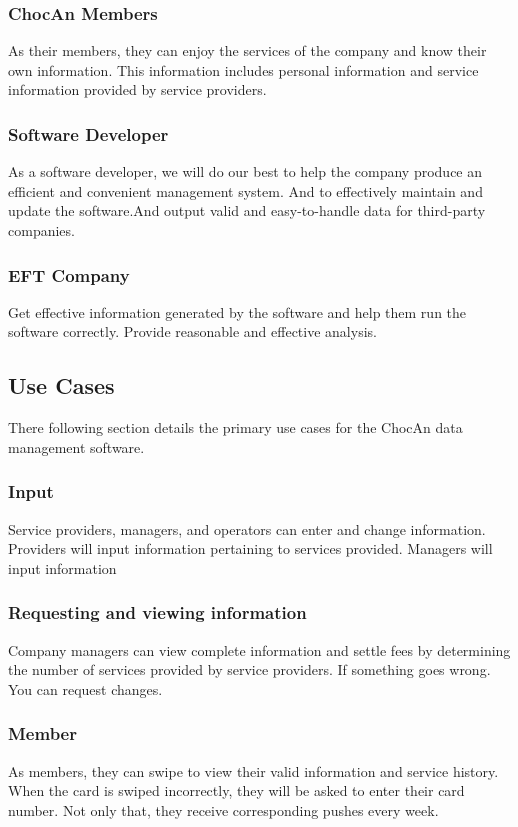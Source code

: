 \documentclass{article}
\begin{document}
\subsubsection{ChocAn Members}
As their members, they can enjoy the services of the company and know their own information. This information includes personal information and service information provided by service providers.

\subsubsection{Software Developer}
As a software developer, we will do our best to help the company produce an efficient and convenient management system. And to effectively maintain and update the software.And output valid and easy-to-handle data for third-party companies.

\subsubsection{EFT Company }
Get effective information generated by the software and help them run the software correctly. Provide reasonable and effective analysis.



\subsection{Use Cases}
There following section details the primary use cases for the ChocAn data management software.

\subsubsection{Input}
Service providers, managers, and operators can enter and change information. Providers will input information pertaining to services provided. Managers will input information

\subsubsection{Requesting and viewing information}
Company managers can view complete information and settle fees by determining the number of services provided by service providers. If something goes wrong. You can request changes.

\subsubsection{Member}
As members, they can swipe to view their valid information and service history. When the card is swiped incorrectly, they will be asked to enter their card number. Not only that, they receive corresponding pushes every week.
\end{document}
